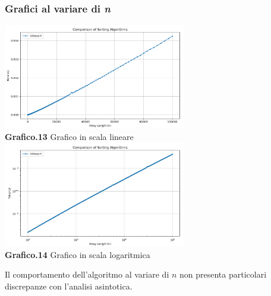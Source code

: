 \documentclass{article}
\begin{document}
        \subsubsection{Grafici al variare di \textit{n}}
            \begin{center}
                \includegraphics[width=0.6\textwidth]{Introsort.png} \\
                \textbf{Grafico.13} Grafico in scala lineare\\
                \vspace{0.5cm}
                \includegraphics[width=0.6\textwidth]{Introsort_Log.png} \\
                \textbf{Grafico.14} Grafico in scala logaritmica\\
            \end{center}
            Il comportamento dell'algoritmo al variare di $n$ non presenta particolari discrepanze con l'analisi asintotica.
\end{document}
